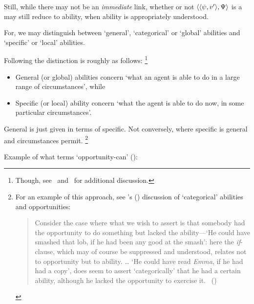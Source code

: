 \begin{note}
  Still, while there may not be an \emph{immediate} link, whether or not \(\langle \langle \psi, v' \rangle, \Psi \rangle\) is a \fc{} may still reduce to ability, when ability is appropriately understood.

  \nocite{Maier:2018uo}
  For, we may distinguish between `general', `categorical' or `global' abilities and `specific' or `local' abilities.

  Following \textcite[2]{Whittle:2010wr} the distinction is roughly as follows:%
  \footnote{
    Though, see~\textcite[esp.\ \S4]{Kittle:2015tb} and~\textcite[1--2]{Kikkert:2022wp} for additional discussion.%
  }
  \begin{itemize}[noitemsep]
  \item
    General (or global) abilities concern `what an agent is able to do in a large range of circumstances', while
  \item
    Specific (or local) ability concern `what the agent is able to do now, in some particular circumstances'.
  \end{itemize}

  General is just given in terms of specific.
  Not conversely, where specific is general and circumstances permit.%
  \footnote{
    For an example of this approach, see \citeauthor{Austin:1961vz}'s (\citeyear{Austin:1961vz}) discussion of `categorical' abilities and opportunities:

    \begin{quote}
      Consider the case where what we wish to assert is that somebody had the opportunity to do something but lacked the ability---`He could have smashed that lob, if he had been any good at the smash':
      here the \emph{if}-clause, which may of course be suppressed and understood, relates not to opportunity but to ability.
      \dots
      `He could have read \emph{Emma}, if he had had a copy', does seem to assert `categorically' that he had a certain ability, although he lacked the opportunity to exercise it.%
      \mbox{ }\hfill\mbox{(\citeyear[177]{Austin:1961vz})}
    \end{quote}
  }

  Example of what \textcite{Hackl:1998tt} terms `opportunity-can' (\citeyear[14]{Hackl:1998tt}):


\end{note}
